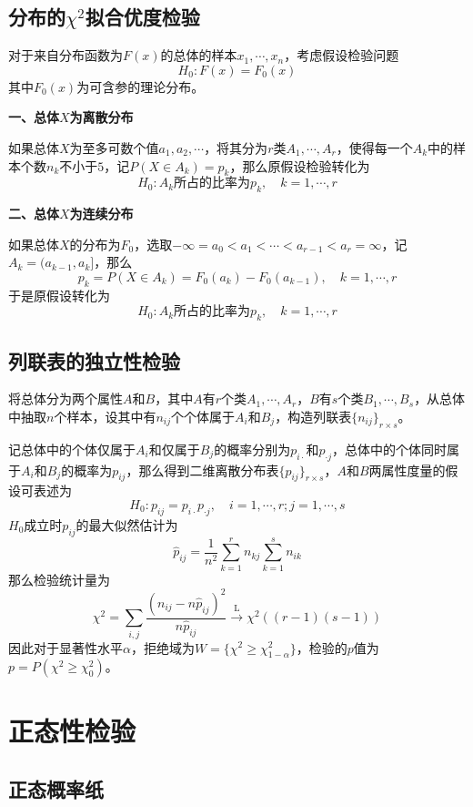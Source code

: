\documentclass[lang = cn, scheme = chinese, thmcnt = section]{elegantbook}
\begin{document}
\subsection{分布的$\chi^2$拟合优度检验}

对于来自分布函数为$F(x)$的总体的样本$x_1,\cdots,x_n$，考虑假设检验问题
$$
H_0:F(x)=F_0(x)
$$
其中$F_0(x)$为可含参的理论分布。

\textbf{一、总体$X$为离散分布}

如果总体$X$为至多可数个值$a_1,a_2,\cdots$，将其分为$r$类$A_1,\cdots,A_r$，使得每一个$A_k$中的样本个数$n_k$不小于$5$，记$P(X\in A_k)=p_k$，那么原假设检验转化为
$$
H_0:A_k所占的比率为p_k,\quad k=1,\cdots,r
$$

\textbf{二、总体$X$为连续分布}

如果总体$X$的分布为$F_0$，选取$-\infty=a_0<a_1<\cdots<a_{r-1}<a_r=\infty$，记$A_k=(a_{k-1},a_k]$，那么
$$
p_k=P(X\in A_k)=F_0(a_k)-F_0(a_{k-1}),\quad k=1,\cdots,r
$$
于是原假设转化为
$$
H_0:A_k所占的比率为p_k,\quad k=1,\cdots,r
$$

\subsection{列联表的独立性检验}

将总体分为两个属性$A$和$B$，其中$A$有$r$个类$A_1,\cdots,A_r$，$B$有$s$个类$B_1,\cdots,B_s$，从总体中抽取$n$个样本，设其中有$n_{ij}$个个体属于$A_i$和$B_j$，构造列联表$\{n_{ij}\}_{r\times s}$。

记总体中的个体仅属于$A_i$和仅属于$B_j$的概率分别为$p_{i\cdot}$和$p_{\cdot j}$，总体中的个体同时属于$A_i$和$B_j$的概率为$p_{ij}$，那么得到二维离散分布表$\{p_{ij}\}_{r\times s}$，$A$和$B$两属性度量的假设可表述为
$$
H_0:p_{ij}=p_{i\cdot}p_{\cdot j},\quad
i=1,\cdots,r;j=1,\cdots,s
$$
$H_0$成立时$p_{ij}$的最大似然估计为
$$
\hat{p}_{ij}=\frac{1}{n^2}\sum_{k=1}^{r}{n_{kj}}\sum_{k=1}^{s}{n_{ik}}
$$
那么检验统计量为
$$
\chi^2=\sum_{i,j}{\frac{(n_{ij}-n\hat{p}_{ij})^2}{n\hat{p}_{ij}}}\xrightarrow{\mathrm{L}}\chi^2((r-1)(s-1))
$$
因此对于显著性水平$\alpha$，拒绝域为$W=\{ \chi^2\ge\chi^2_{1-\alpha} \}$，检验的$p$值为$p=P(\chi^2\ge\chi^2_0)$。

\section{正态性检验}

\subsection{正态概率纸}
\end{document}
